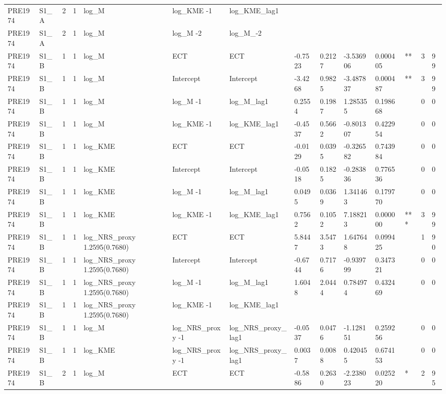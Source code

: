 \begin{tabular}{llllllllllllll}
PRE1974 & S1\_A & 2 & 1 & log\_M & log\_KME -1 & log\_KME\_lag1 &  &  &  &  &  &  &  \\
PRE1974 & S1\_A & 2 & 1 & log\_M & log\_M -2 & log\_M\_-2 &  &  &  &  &  &  &  \\
PRE1974 & S1\_B & 1 & 1 & log\_M & ECT & ECT & -0.7523 & 0.2127 & -3.536906 & 0.000405 & ** & 3 & 99 \\
PRE1974 & S1\_B & 1 & 1 & log\_M & Intercept & Intercept & -3.4268 & 0.9825 & -3.487837 & 0.000487 & ** & 3 & 99 \\
PRE1974 & S1\_B & 1 & 1 & log\_M & log\_M -1 & log\_M\_lag1 & 0.2554 & 0.1987 & 1.285355 & 0.198668 &  & 0 & 0 \\
PRE1974 & S1\_B & 1 & 1 & log\_M & log\_KME -1 & log\_KME\_lag1 & -0.4537 & 0.5662 & -0.801307 & 0.422954 &  & 0 & 0 \\
PRE1974 & S1\_B & 1 & 1 & log\_KME & ECT & ECT & -0.0129 & 0.0395 & -0.326582 & 0.743984 &  & 0 & 0 \\
PRE1974 & S1\_B & 1 & 1 & log\_KME & Intercept & Intercept & -0.0518 & 0.1825 & -0.283836 & 0.776536 &  & 0 & 0 \\
PRE1974 & S1\_B & 1 & 1 & log\_KME & log\_M -1 & log\_M\_lag1 & 0.0495 & 0.0369 & 1.341463 & 0.179770 &  & 0 & 0 \\
PRE1974 & S1\_B & 1 & 1 & log\_KME & log\_KME -1 & log\_KME\_lag1 & 0.7562 & 0.1052 & 7.188213 & 0.000000 & *** & 3 & 99 \\
PRE1974 & S1\_B & 1 & 1 & log\_NRS\_proxy 1.2595(0.7680) & ECT & ECT & 5.8447 & 3.5473 & 1.647648 & 0.099425 &  & 1 & 90 \\
PRE1974 & S1\_B & 1 & 1 & log\_NRS\_proxy 1.2595(0.7680) & Intercept & Intercept & -0.6744 & 0.7176 & -0.939799 & 0.347321 &  & 0 & 0 \\
PRE1974 & S1\_B & 1 & 1 & log\_NRS\_proxy 1.2595(0.7680) & log\_M -1 & log\_M\_lag1 & 1.6048 & 2.0444 & 0.784974 & 0.432469 &  & 0 & 0 \\
PRE1974 & S1\_B & 1 & 1 & log\_NRS\_proxy 1.2595(0.7680) & log\_KME -1 & log\_KME\_lag1 &  &  &  &  &  &  &  \\
PRE1974 & S1\_B & 1 & 1 & log\_M & log\_NRS\_proxy -1 & log\_NRS\_proxy\_lag1 & -0.0537 & 0.0476 & -1.128151 & 0.259256 &  & 0 & 0 \\
PRE1974 & S1\_B & 1 & 1 & log\_KME & log\_NRS\_proxy -1 & log\_NRS\_proxy\_lag1 & 0.0037 & 0.0088 & 0.420455 & 0.674153 &  & 0 & 0 \\
PRE1974 & S1\_B & 2 & 1 & log\_M & ECT & ECT & -0.5886 & 0.2630 & -2.238023 & 0.025220 & * & 2 & 95 \\

\end{tabular}
